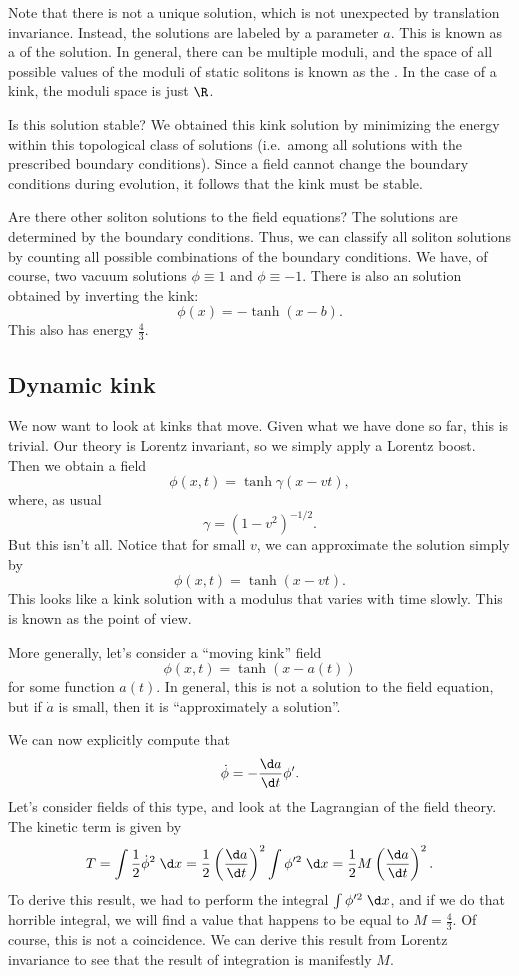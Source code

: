 \documentclass[a4paper]{article}
\begin{document}
Note that there is not a unique solution, which is not unexpected by translation invariance. Instead, the solutions are labeled by a parameter $a$. This is known as a  of the solution. In general, there can be multiple moduli, and the space of all possible values of the moduli of static solitons is known as the . In the case of a kink, the moduli space is just $\R$.

Is this solution stable? We obtained this kink solution by minimizing the energy within this topological class of solutions (i.e.\ among all solutions with the prescribed boundary conditions). Since a field cannot change the boundary conditions during evolution, it follows that the kink must be stable.

Are there other soliton solutions to the field equations? The solutions are determined by the boundary conditions. Thus, we can classify all soliton solutions by counting all possible combinations of the boundary conditions. We have, of course, two vacuum solutions $\phi \equiv 1$ and $\phi \equiv -1$. There is also an  solution obtained by inverting the kink:
\[
  \phi(x) = - \tanh (x - b).
\]
This also has energy $\frac{4}{3}$.

\subsection{Dynamic kink}
We now want to look at kinks that move. Given what we have done so far, this is trivial. Our theory is Lorentz invariant, so we simply apply a Lorentz boost. Then we obtain a field
\[
  \phi(x, t) = \tanh \gamma (x - vt),
\]
where, as usual
\[
  \gamma = (1 - v^2)^{-1/2}.
\]
But this isn't all. Notice that for small $v$, we can approximate the solution simply by
\[
  \phi(x, t) = \tanh (x - vt).
\]
This looks like a kink solution with a modulus that varies with time slowly. This is known as the  point of view.

More generally, let's consider a ``moving kink'' field
\[
  \phi(x, t) = \tanh (x - a(t))
\]
for some function $a(t)$. In general, this is not a solution to the field equation, but if $\dot{a}$ is small, then it is ``approximately a solution''.

We can now explicitly compute that
\[
  \dot{\phi} = - \frac{\d a}{\d t} \phi'.
\]
Let's consider fields of this type, and look at the Lagrangian of the field theory. The kinetic term is given by
\[
  T = \int \frac{1}{2} \dot{\phi}^2\;\d x = \frac{1}{2} \left(\frac{\d a}{\d t}\right)^2 \int \phi'^2 \;\d x = \frac{1}{2} M \left(\frac{\d a}{\d t}\right)^2.
\]
To derive this result, we had to perform the integral $\int \phi'^2 \;\d x$, and if we do that horrible integral, we will find a value that happens to be equal to $M = \frac{4}{3}$. Of course, this is not a coincidence. We can derive this result from Lorentz invariance to see that the result of integration is manifestly $M$.
\end{document}
